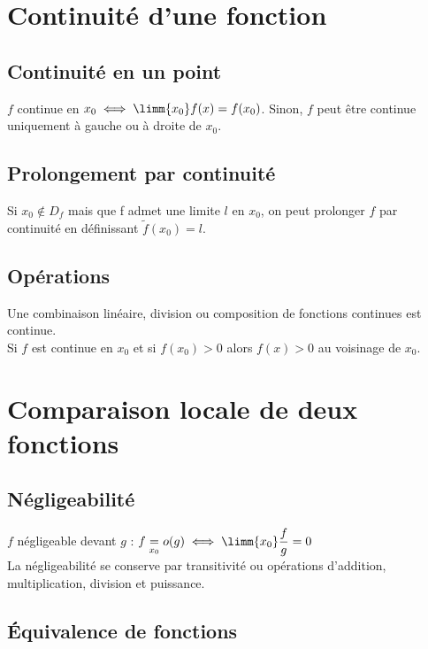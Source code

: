 \section{Continuité d'une fonction}\label{sec:continuite-d'une-fonction}

\subsection{Continuité en un point}\label{subsec:continuite-en-un-point}

$f$ continue en $x_0 \iff \limm{x_0} f(x) = f(x_0)$.
Sinon, $f$ peut être continue uniquement à gauche ou à droite de $x_0$.

\subsection{Prolongement par continuité}\label{subsec:prolongement-par-continuite}

Si $x_0 \not\in D_f$ mais que f admet une limite $l$ en $x_0$, on peut prolonger $f$ par continuité en définissant $\tilde{f}(x_0) = l$.

\subsection{Opérations}\label{subsec:operations}

Une combinaison linéaire, division ou composition de fonctions continues est continue.\\
Si $f$ est continue en $x_0$ et si $f(x_0) > 0$ alors $f(x) > 0$ au voisinage de $x_0$.


\section{Comparaison locale de deux fonctions}\label{sec:comparaison-locale-de-deux-fonctions}

\subsection{Négligeabilité}\label{subsec:negligeabilite}

$f$ négligeable devant $g$ : $f \underset{x_0}{=} o(g) \iff \limm{x_0} \dfrac{f}{g} = 0$\\
La négligeabilité se conserve par transitivité ou opérations d'addition, multiplication, division et puissance.

\subsection{Équivalence de fonctions}\label{subsec:equivalence-de-fonctions}

